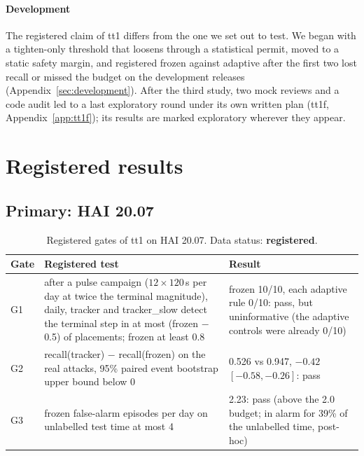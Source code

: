\documentclass[sigconf]{acmart}
\begin{document}
\paragraph{Development}
The registered claim of tt1 differs from the one we set out to test. We began with a tighten-only
threshold that loosens through a statistical permit, moved to a static safety margin, and registered
frozen against adaptive after the first two lost recall or missed the budget on the development
releases (Appendix~\ref{sec:development}). After the third study, two mock reviews and a code audit
led to a last exploratory round under its own written plan (tt1f, Appendix~\ref{app:tt1f}); its results
are marked exploratory wherever they appear.

\section{Registered results}
\label{sec:registered}

\subsection{Primary: HAI 20.07}

\begin{table}[t]
\caption{Registered gates of tt1 on HAI 20.07. Data status: \textbf{registered}.}
\label{tab:gates}
\begin{tabular}{@{}p{}p{}p{}@{}}
\toprule
Gate & Registered test & Result \\
\midrule
G1 & after a pulse campaign ($12 \times 120$\,s per day at twice the terminal magnitude), daily, tracker and tracker\_slow detect the terminal step in at most (frozen $-$ 0.5) of placements; frozen at least 0.8 & frozen 10/10, each adaptive rule 0/10: pass, but uninformative (the adaptive controls were already 0/10) \\
G2 & recall(tracker) $-$ recall(frozen) on the real attacks, 95\% paired event bootstrap upper bound below 0 & 0.526 vs 0.947, $-0.42$ $[-0.58, -0.26]$: pass \\
G3 & frozen false-alarm episodes per day on unlabelled test time at most 4 & 2.23: pass (above the 2.0 budget; in alarm for 39\% of the unlabelled time, post-hoc) \\
\bottomrule
\end{tabular}
\end{table}
\end{document}

